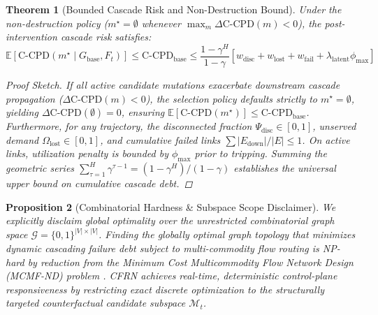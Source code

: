 \documentclass[pdflatex,sn-mathphys-num]{sn-jnl}
\theoremstyle{thmstyleone}
\newtheorem{theorem}{Theorem}
\newtheorem{proposition}[theorem]{Proposition}
\theoremstyle{thmstyletwo}
\theoremstyle{thmstylethree}
\begin{document}
\begin{theorem}[Bounded Cascade Risk and Non-Destruction Bound]
Under the non-destruction policy ($m^\star = \emptyset$ whenever $\max_m \Delta \mathrm{C\text{-}CPD}(m) < 0$), the post-intervention cascade risk satisfies:
\begin{equation}
\mathbb{E}[\mathrm{C\text{-}CPD}(m^\star \mid G_{\mathrm{base}}, F_t)] \le \mathrm{C\text{-}CPD}_{\mathrm{base}} \le \frac{1 - \gamma^H}{1 - \gamma} \left[ w_{\mathrm{disc}} + w_{\mathrm{lost}} + w_{\mathrm{fail}} + \lambda_{\mathrm{latent}} \phi_{\max} \right]
\end{equation}
\begin{proof}[Proof Sketch]
If all active candidate mutations exacerbate downstream cascade propagation ($\Delta \mathrm{C\text{-}CPD}(m) < 0$), the selection policy defaults strictly to $m^\star = \emptyset$, yielding $\Delta \mathrm{C\text{-}CPD}(\emptyset) = 0$, ensuring $\mathbb{E}[\mathrm{C\text{-}CPD}(m^\star)] \le \mathrm{C\text{-}CPD}_{\mathrm{base}}$. Furthermore, for any trajectory, the disconnected fraction $\Psi_{\mathrm{disc}} \in [0, 1]$, unserved demand $\Omega_{\mathrm{lost}} \in [0, 1]$, and cumulative failed links $\sum |E_{\mathrm{down}}| / |E| \le 1$. On active links, utilization penalty is bounded by $\phi_{\max}$ prior to tripping. Summing the geometric series $\sum_{\tau=1}^H \gamma^{\tau-1} = (1 - \gamma^H)/(1 - \gamma)$ establishes the universal upper bound on cumulative cascade debt.
\end{proof}
\end{theorem}

\begin{proposition}[Combinatorial Hardness \& Subspace Scope Disclaimer]
We explicitly disclaim global optimality over the unrestricted combinatorial graph space $\mathcal{G} = \{0, 1\}^{|V| \times |V|}$. Finding the globally optimal graph topology that minimizes dynamic cascading failure debt subject to multi-commodity flow routing is NP-hard by reduction from the Minimum Cost Multicommodity Flow Network Design (MCMF-ND) problem \cite{garey1979computers}. CFRN achieves real-time, deterministic control-plane responsiveness by restricting exact discrete optimization to the structurally targeted counterfactual candidate subspace $\mathcal{M}_t$.
\end{proposition}
\end{document}

